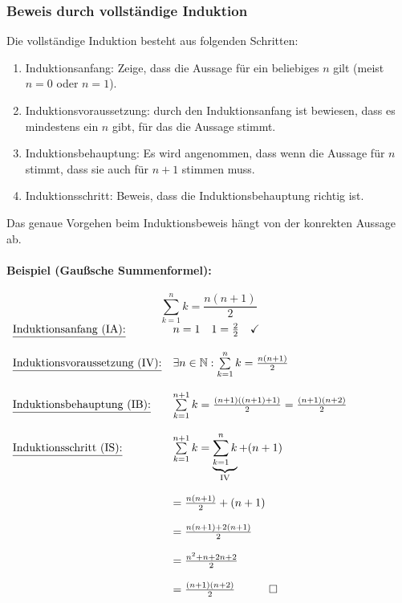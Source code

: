 \documentclass[11pt]{article}
\begin{document}
\subsubsection{Beweis durch vollständige Induktion}
Die vollständige Induktion besteht aus folgenden Schritten:
\begin{enumerate}
  \item Induktionsanfang: Zeige, dass die Aussage für ein beliebiges $n$ gilt (meist $n = 0$ oder $n = 1$).
  \item Induktionsvoraussetzung: durch den Induktionsanfang ist bewiesen, dass es mindestens ein $n$ gibt, für das die Aussage stimmt.
  \item Induktionsbehauptung: Es wird angenommen, dass wenn die Aussage für $n$ stimmt, dass sie auch für $n + 1$ stimmen muss.
  \item Induktionsschritt: Beweis, dass die Induktionsbehauptung richtig ist.
\end{enumerate}
Das genaue Vorgehen beim Induktionsbeweis hängt von der konrekten Aussage ab.

\paragraph{Beispiel (Gaußsche Summenformel):}
\[
  \sum\limits_{k=1}^{n}k = \frac{n(n+1)}{2}
\]
$
  \begin{array}{l l}
    \text{\underline{Induktionsanfang (IA):}}        & n = 1 \quad  1=\frac{2}{2}\quad\checkmark                                          \\\\
    \text{\underline{Induktionsvoraussetzung (IV):}} & \exists n \in \mathbb{N} : \sum\limits_{k=1}^{n}k = \frac{n(n+1)}{2}                       \\\\
    \text{\underline{Induktionsbehauptung (IB):}}    & \sum\limits_{k=1}^{n+1}k = \frac{(n+1)((n+1)+1)}{2} = \frac{(n+1)(n+2)}{2}         \\\\
    \text{\underline{Induktionsschritt (IS):}}       & \sum\limits_{k=1}^{n+1}k = \underbrace{\sum\limits_{k=1}^{n}k}_{\text{IV}} + (n+1) \\\\
                                                     & = \frac{n(n+1)}{2} + (n+1)                                                         \\\\
                                                     & = \frac{n(n+1) + 2(n+1)}{2}                                                        \\\\
                                                     & = \frac{n^2+n+2n+2}{2}                                                             \\\\
                                                     & = \frac{(n+1)(n+2)}{2}\quad \qed
  \end{array}
$
\end{document}
